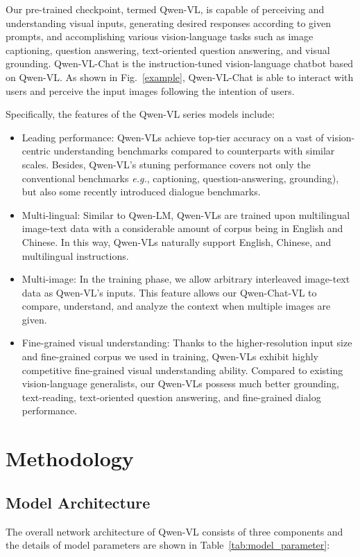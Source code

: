 \documentclass{article}
\begin{document}
Our pre-trained checkpoint, termed Qwen-VL, is capable of perceiving and understanding visual inputs, generating desired responses according to given prompts, and accomplishing various vision-language tasks such as image captioning, question answering, text-oriented question answering, and visual grounding.
Qwen-VL-Chat is the instruction-tuned vision-language chatbot based on Qwen-VL.
As shown in Fig.~\ref{example}, Qwen-VL-Chat is able to interact with users and perceive the input images following the intention of users.

Specifically, the features of the Qwen-VL series models include:
\begin{itemize}

\item Leading performance: Qwen-VLs achieve top-tier accuracy on a vast of vision-centric understanding benchmarks compared to counterparts with similar scales. Besides, Qwen-VL's stuning performance covers not only the conventional benchmarks \emph{e.g.}, captioning, question-answering, grounding), but also some recently introduced dialogue benchmarks.

\item Multi-lingual: Similar to Qwen-LM, Qwen-VLs are trained upon multilingual image-text data with a considerable amount of corpus being in English and Chinese. In this way, Qwen-VLs naturally support English, Chinese, and multilingual instructions.

\item Multi-image: In the training phase, we allow arbitrary interleaved image-text data as Qwen-VL's inputs. This feature allows our Qwen-Chat-VL to compare, understand, and analyze the context when multiple images are given.

\item Fine-grained visual understanding: Thanks to the higher-resolution input size and fine-grained corpus we used in training, Qwen-VLs exhibit highly competitive fine-grained visual understanding ability. Compared to existing vision-language generalists, our Qwen-VLs possess much better grounding, text-reading, text-oriented question answering, and fine-grained dialog performance.
\end{itemize}

\section{Methodology}

\subsection{Model Architecture}
The overall network architecture of Qwen-VL consists of three components and the details of model parameters are shown in Table~\ref{tab:model_parameter}:
\end{document}
